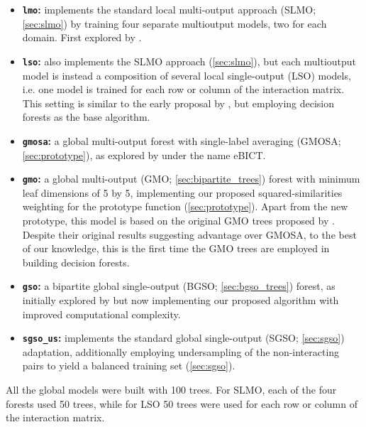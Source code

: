 \begin{itemize}
    \item \textbf{\texttt{lmo}:} implements the standard local multi-output approach (SLMO; \autoref{sec:slmo}) by training four separate multioutput models, two for each domain. First explored by .
    \item \textbf{\texttt{lso}:} also implements the SLMO approach (\autoref{sec:slmo}), but each multioutput model is instead a composition of several local single-output (LSO) models, i.e. one model is trained for each row or column of the interaction matrix. This setting is similar to the early proposal by , but employing decision forests as the base algorithm.
    \item \textbf{\texttt{gmosa}:} a global multi-output forest with single-label averaging (GMOSA; \autoref{sec:prototype}), as explored by  under the name eBICT.
    \item \textbf{\texttt{gmo}:} a global multi-output (GMO; \autoref{sec:bipartite_trees}) forest with minimum leaf dimensions of 5 by 5, implementing our proposed squared-similarities weighting for the prototype function (\autoref{sec:prototype}). Apart from the new prototype, this model is based on the original GMO trees proposed by . Despite their original results suggesting advantage over GMOSA, to the best of our knowledge, this is the first time the GMO trees are employed in building decision forests.  %
    \item \textbf{\texttt{gso}:} a bipartite global single-output (BGSO; \autoref{sec:bgso_trees}) forest, as initially explored by  but now implementing our proposed algorithm with improved computational complexity.
    \item \textbf{\texttt{sgso\_us}:} implements the standard global single-output (SGSO; \autoref{sec:sgso}) adaptation, additionally employing undersampling of the non-interacting pairs to yield a balanced training set (\autoref{sec:sgso}).  %
\end{itemize}

All the global models were built with 100 trees. For SLMO, each of the four forests used 50 trees, while for LSO 50 trees were used for each row or column of the interaction matrix.


